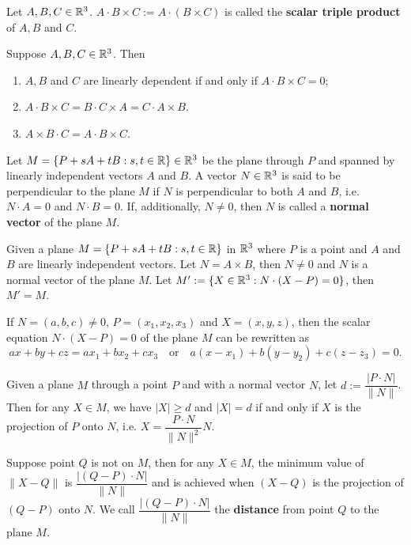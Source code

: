     \begin{definitionenv}
        Let $A,B,C\in \mathbb{R}^3$. $A\cdot B \times C := A\cdot (B\times C)$ is called the \textbf{scalar triple product} of $A,B$ and $C$.
    \end{definitionenv}
    \begin{theoremenv}
        Suppose $A,B,C\in \mathbb{R}^3$. Then
        \begin{enumerate}[label=(\arabic*)]
            \item $A,B$ and $C$ are linearly dependent if and only if $A\cdot B \times C = 0$;
            \item $A \cdot B \times C = B \cdot C \times A = C \cdot A \times B$.
            \item $A \times B \cdot C = A \cdot B \times C$.
        \end{enumerate}
    \end{theoremenv}
    \begin{definitionenv}
        Let $M = \{ P + sA + tB : s,t\in \mathbb{R}\} \in \mathbb{R}^3$ be the plane through $P$ and spanned by linearly independent vectors $A$ and $B$. A vector $N \in \mathbb{R}^3$ is said to be perpendicular to the plane $M$ if $N$ is perpendicular to both $A$ and $B$, i.e. $N\cdot A = 0$ and $N\cdot B = 0$. If, additionally, $N\ne 0$, then $N$ is called a \textbf{normal vector} of the plane $M$.
    \end{definitionenv}
    \begin{theoremenv}
        Given a plane $M = \{ P + sA + tB : s,t\in \mathbb{R}\}$ in $\mathbb{R}^3$ where $P$ is a point and $A$ and $B$ are linearly independent vectors. Let $N=A\times B$, then $N \ne 0 $ and $N$ is a normal vector of the plane $M$. Let $M' := \{ X\in \mathbb{R}^3 : N\cdot (X-P) = 0\}$, then $M' = M$.
    \end{theoremenv}
    \begin{remarkenv}
        If $N=(a,b,c) \ne 0$, $P=(x_1,x_2,x_3)$ and $X=(x,y,z)$, then the scalar equation $N\cdot (X-P) = 0$ of the plane $M$ can be rewritten as
        \[
        ax + by + cz = ax_1 + bx_2 + cx_3 \quad \text{or} \quad a(x-x_1) + b(y-y_2) + c(z-z_3) = 0.
        \]
    \end{remarkenv}
    \begin{theoremenv}
        Given a plane $M$ through a point $P$ and with a normal vector $N$, let $d:= \dfrac{|P\cdot N|}{\|N\|}$. Then for any $X\in M$, we have $|X| \ge d$ and $|X| = d$ if and only if $X$ is the projection of $P$ onto $N$, i.e. $X = \dfrac{P\cdot N}{\|N\|^2} N$.
    \end{theoremenv}
    \begin{remarkenv}
        Suppose point $Q$ is not on $M$, then for any $X\in M$, the minimum value of $\| X-Q\|$ is $\dfrac{| (Q-P)\cdot N |}{\|N\|}$ and is achieved when $(X-Q)$ is the projection of $(Q-P)$ onto $N$. We call $\dfrac{| (Q-P)\cdot N |}{\|N\|}$ the \textbf{distance} from point $Q$ to the plane $M$.
    \end{remarkenv}

    \newpage